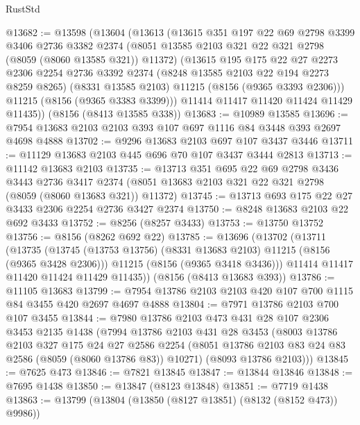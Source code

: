 \begin{lexlean}{RustStd}
\begin{coremodule}
@13682 := @13598
    (@13604
      (@13613
        (@13615
          @351
          @197
          @22
          @69
          @2798
          @3399
          @3406
          @2736
          @3382
          @2374
          (@8051 @13585 @2103 @321 @22 @321 @2798 (@8059 (@8060 @13585 @321)) @11372)
          (@13615
            @195
            @175
            @22
            @27
            @2273
            @2306
            @2254
            @2736
            @3392
            @2374
            (@8248 @13585 @2103 @22 @194 @2273 @8259 @8265)
            (@8331 @13585 @2103)
            @11215
            (@8156 (@9365 @3393 @2306)))
          @11215
          (@8156 (@9365 @3383 @3399)))
        @11414
        @11417
        @11420
        @11424
        @11429
        @11435))
    (@8156 (@8413 @13585 @338))
@13683 := @10989 @13585
@13696 := @7954 @13683 @2103 @2103 @393 @107 @697 @1116 @84 @3448 @393 @2697 @4698 @4888
@13702 := @9296 @13683 @2103 @697 @107 @3437 @3446
@13711 := @11129 @13683 @2103 @445 @696 @70 @107 @3437 @3444 @2813
@13713 := @11142 @13683 @2103
@13735 := @13713
    @351
    @695
    @22
    @69
    @2798
    @3436
    @3443
    @2736
    @3417
    @2374
    (@8051 @13683 @2103 @321 @22 @321 @2798 (@8059 (@8060 @13683 @321)) @11372)
@13745 := @13713 @693 @175 @22 @27 @3433 @2306 @2254 @2736 @3427 @2374
@13750 := @8248 @13683 @2103 @22 @692 @3433
@13752 := @8256 (@8257 @3433)
@13753 := @13750 @13752
@13756 := @8156 (@8262 @692 @22)
@13785 := @13696
    (@13702
      (@13711
        (@13735
          (@13745 (@13753 @13756) (@8331 @13683 @2103) @11215 (@8156 (@9365 @3428 @2306)))
          @11215
          (@8156 (@9365 @3418 @3436)))
        @11414
        @11417
        @11420
        @11424
        @11429
        @11435))
    (@8156 (@8413 @13683 @393))
@13786 := @11105 @13683
@13799 := @7954 @13786 @2103 @2103 @420 @107 @700 @1115 @84 @3455 @420 @2697 @4697 @4888
@13804 := @7971 @13786 @2103 @700 @107 @3455
@13844 := @7980
    @13786
    @2103
    @473
    @431
    @28
    @107
    @2306
    @3453
    @2135
    @1438
    (@7994
      @13786
      @2103
      @431
      @28
      @3453
      (@8003
        @13786
        @2103
        @327
        @175
        @24
        @27
        @2586
        @2254
        (@8051 @13786 @2103 @83 @24 @83 @2586 (@8059 (@8060 @13786 @83)) @10271)
        (@8093 @13786 @2103)))
@13845 := @7625 @473
@13846 := @7821 @13845
@13847 := @13844 @13846
@13848 := @7695 @1438
@13850 := @13847 (@8123 @13848)
@13851 := @7719 @1438
@13863 := @13799
    (@13804 (@13850 (@8127 @13851) (@8132 (@8152 @473)) @9986))

\end{coremodule}
\end{lexlean}
